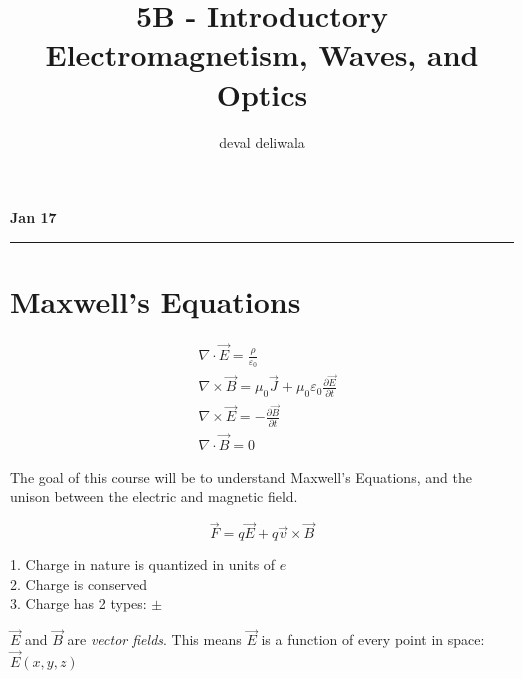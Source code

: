 \documentclass[svgnames]{article}   	%
\title{5B - Introductory Electromagnetism, Waves, and Optics}
\author{deval deliwala}
\begin{document}
\maketitle
\tableofcontents 					           %
\newpage

\noindent \textbf{Jan 17} 
\hrule
\section{Maxwell's Equations}

\begin{align*} 
      &\nabla \cdot \vec{E} = \frac{\rho}{\varepsilon_0}      \\  
      &\nabla \times \vec{B} = \mu_0\vec{J} + \mu_0\varepsilon_0 \frac{\partial
      \vec{E}}{\partial t} \\
      &\nabla \times \vec{E} = - \frac{\partial \vec{B}}{\partial t} \\
      &\nabla \cdot \vec{B} = 0
\end{align*}
\vspace{5px}

The goal of this course will be to understand Maxwell's Equations, and the
unison between the electric and magnetic field. 
\vspace{5px}

\begin{tcolorbox}[colback = red!5!white, colframe = red!50!black, title
  = Lorent'z Force eq]
  \[
  \vec{F} = q\vec{E} + q\vec{v} \times \vec{B}
  \]
\end{tcolorbox}
\vspace{5px}
\begin{tcolorbox}[colback = blue!5!white, colframe = blue!50!black, title
  = Rules]
  
  1. Charge in nature is quantized in units of $e$ \\
  2. Charge is conserved \\
  3. Charge has 2 types: $\pm$

\end{tcolorbox}
\vspace{5px}

$\vec{E}$ and $\vec{B}$ are \textit{vector fields}. This means $\vec{E}$ is
a function of every point in space: $\vec{E}(x,y,z)$
\end{document}
